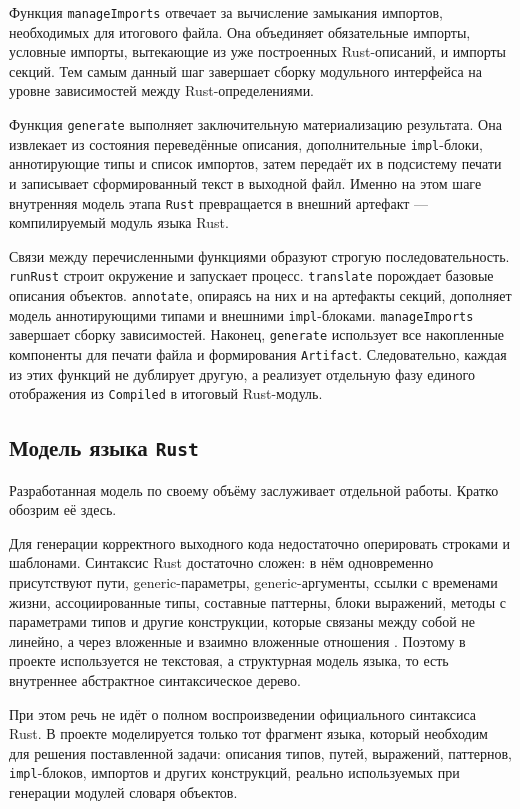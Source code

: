 \documentclass[a4paper,12pt]{article}
\begin{document}
Функция \texttt{manageImports} отвечает за вычисление замыкания импортов, необходимых
для итогового файла. Она объединяет обязательные импорты, условные импорты, вытекающие
из уже построенных Rust-описаний, и импорты секций. Тем самым данный шаг завершает
сборку модульного интерфейса на уровне зависимостей между Rust-определениями.

Функция \texttt{generate} выполняет заключительную материализацию результата. Она
извлекает из состояния переведённые описания, дополнительные \texttt{impl}-блоки,
аннотирующие типы и список импортов, затем передаёт их в подсистему печати и записывает
сформированный текст в выходной файл. Именно на этом шаге внутренняя модель этапа
\texttt{Rust} превращается в внешний артефакт --- компилируемый модуль языка Rust.

Связи между перечисленными функциями образуют строгую последовательность. \texttt{runRust}
строит окружение и запускает процесс. \texttt{translate} порождает базовые описания
объектов. \texttt{annotate}, опираясь на них и на артефакты секций, дополняет модель
аннотирующими типами и внешними \texttt{impl}-блоками. \texttt{manageImports}
завершает сборку зависимостей. Наконец, \texttt{generate} использует все накопленные
компоненты для печати файла и формирования \texttt{Artifact}. Следовательно, каждая из
этих функций не дублирует другую, а реализует отдельную фазу единого отображения из
\texttt{Compiled} в итоговый Rust-модуль.

\subsection{Модель языка \texttt{Rust}}

Разработанная модель по своему объёму заслуживает отдельной работы. Кратко обозрим её
здесь.

Для генерации корректного выходного кода недостаточно оперировать строками и шаблонами.
Синтаксис Rust достаточно сложен: в нём одновременно присутствуют пути, generic-параметры,
generic-аргументы, ссылки с временами жизни, ассоциированные типы, составные паттерны,
блоки выражений, методы с параметрами типов и другие конструкции, которые связаны между
собой не линейно, а через вложенные и взаимно вложенные отношения
\cite{rust_reference_grammar}. Поэтому в проекте используется не текстовая, а
структурная модель языка, то есть внутреннее абстрактное синтаксическое дерево.

При этом речь не идёт о полном воспроизведении официального синтаксиса Rust. В проекте
моделируется только тот фрагмент языка, который необходим для решения поставленной
задачи: описания типов, путей, выражений, паттернов, \texttt{impl}-блоков, импортов и
других конструкций, реально используемых при генерации модулей словаря объектов.
\end{document}
